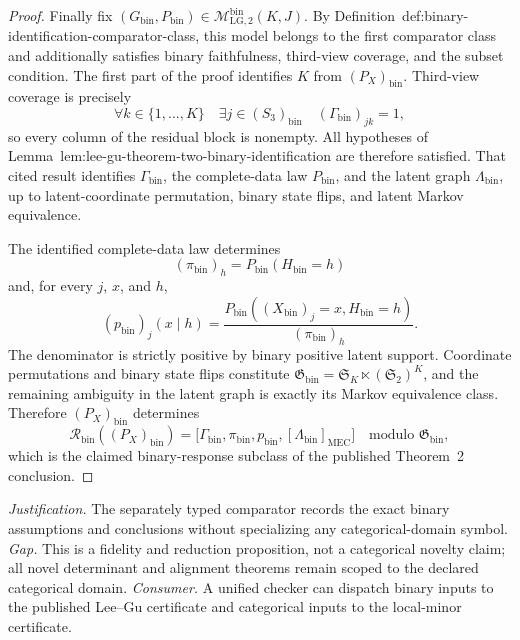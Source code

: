 \documentclass{article}
\begin{document}
\begin{proof}
Finally fix
\((G_{\mathrm{bin}},P_{\mathrm{bin}})\in
\mathcal M_{\mathrm{LG},2}^{\mathrm{bin}}(K,J)\).  By
Definition~\textnormal{def:binary-identification-comparator-class}, this model
belongs to the first comparator class and additionally satisfies binary
faithfulness, third-view coverage, and the subset condition.  The first part
of the proof identifies \(K\) from \((P_X)_{\mathrm{bin}}\).  Third-view
coverage is precisely
\[
 \forall k\in\{1,\ldots,K\}\quad
 \exists j\in(S_3)_{\mathrm{bin}}
 \quad (\Gamma_{\mathrm{bin}})_{jk}=1,
\]
so every column of the residual block is nonempty.  All hypotheses of
Lemma~\textnormal{lem:lee-gu-theorem-two-binary-identification} are therefore
satisfied.  That cited result identifies \(\Gamma_{\mathrm{bin}}\), the
complete-data law \(P_{\mathrm{bin}}\), and the latent graph
\(\Lambda_{\mathrm{bin}}\), up to latent-coordinate permutation, binary
state flips, and latent Markov equivalence.

The identified complete-data law determines
\[
 (\pi_{\mathrm{bin}})_h=P_{\mathrm{bin}}(H_{\mathrm{bin}}=h)
\]
and, for every \(j\), \(x\), and \(h\),
\[
 (p_{\mathrm{bin}})_j(x\mid h)
 =\frac{P_{\mathrm{bin}}((X_{\mathrm{bin}})_j=x,
                         H_{\mathrm{bin}}=h)}
        {(\pi_{\mathrm{bin}})_h}.
\]
The denominator is strictly positive by binary positive latent support.
Coordinate permutations and binary state flips constitute
\(\mathfrak G_{\mathrm{bin}}=\mathfrak S_K\ltimes(\mathfrak S_2)^K\), and
the remaining ambiguity in the latent graph is exactly its Markov equivalence
class.  Therefore \((P_X)_{\mathrm{bin}}\) determines
\[
 \mathcal R_{\mathrm{bin}}((P_X)_{\mathrm{bin}})
 =\bigl[\Gamma_{\mathrm{bin}},\pi_{\mathrm{bin}},p_{\mathrm{bin}},
        [\Lambda_{\mathrm{bin}}]_{\mathrm{MEC}}\bigr]
 \quad\text{modulo }\mathfrak G_{\mathrm{bin}},
\]
which is the claimed binary-response subclass of the published Theorem~2
conclusion.
\end{proof}
\par\smallskip\noindent \textit{Justification.} The separately typed comparator records the exact binary assumptions and conclusions without specializing any categorical-domain symbol. \textit{Gap.} This is a fidelity and reduction proposition, not a categorical novelty claim; all novel determinant and alignment theorems remain scoped to the declared categorical domain. \textit{Consumer.} A unified checker can dispatch binary inputs to the published Lee--Gu certificate and categorical inputs to the local-minor certificate.
\end{document}
